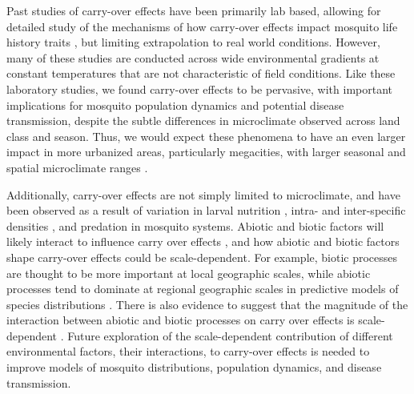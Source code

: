 \documentclass[12pt]{article}
\begin{document}
Past studies of carry-over effects have been primarily lab based, allowing for detailed study of the mechanisms of how carry-over effects impact mosquito life history traits \citep{alto2008, alto2005}, but limiting extrapolation to real world conditions. However, many of these studies are conducted across wide environmental gradients at constant temperatures that are not characteristic of field conditions. Like these laboratory studies, we found carry-over effects to be pervasive, with important implications for mosquito population dynamics and potential disease transmission, despite the subtle differences in microclimate observed across land class and season. Thus, we would expect these phenomena to have an even larger impact in more urbanized areas, particularly megacities, with larger seasonal and spatial microclimate ranges \citep{peng2012}.


Additionally, carry-over effects are not simply limited to microclimate, and have been observed as a result of variation in larval nutrition \citep{moller-jacobs2014}, intra- and inter-specific densities \citep{reiskind2009a, alto2005, alto2008}, and predation \citep{roux2015a} in mosquito systems. Abiotic and biotic factors will likely interact to influence carry over effects \citep{buckner2016, muturi2011d, muturi2012a, muturi2011b, muturi2010}, and how abiotic and biotic factors shape carry-over effects could be scale-dependent. For example, biotic processes are thought to be more important at local geographic scales, while abiotic processes tend to dominate at regional geographic scales in predictive models of species distributions \citep{cohen2016}. There is also evidence to suggest that the magnitude of the interaction between abiotic and biotic processes on carry over effects is scale-dependent \citep{leisnham2014}. Future exploration of the scale-dependent contribution of different environmental factors, their interactions, to carry-over effects is needed to improve models of mosquito distributions, population dynamics, and disease transmission.

\end{document}
